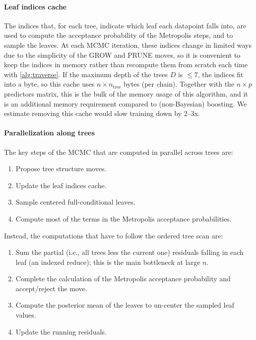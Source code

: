 \documentclass{article}
\begin{document}
\paragraph{Leaf indices cache}

The indices that, for each tree, indicate which leaf each datapoint falls
into, are used to compute the acceptance probability of the Metropolis steps,
and to sample the leaves. At each MCMC iteration, these indices change in
limited ways due to the simplicity of the GROW and PRUNE moves, so it is
convenient to keep the indices in memory rather than recompute them from scratch
each time with \autoref{alg:traverse}. If the maximum depth of the trees $D$ is
$\le 7$, the indices fit into a byte, so this cache uses $n \times
	n_\text{tree}$ bytes (per chain). Together with the $n\times p$ predictors matrix, this is
the bulk of the memory usage of this algorithm, and it is an
additional memory requirement compared to (non-Bayesian) boosting. We estimate
removing this cache would slow training down by 2--3x.

\paragraph{Parallelization along trees}

The key steps of the MCMC that are computed in parallel across trees are:
%
\begin{enumerate}
	\item Propose tree structure moves.
	\item Update the leaf indices cache.
	\item Sample centered full-conditional leaves.
	\item Compute most of the terms in the Metropolis acceptance probabilities.
\end{enumerate}

Instead, the computations that have to follow the ordered tree scan are:
%
\begin{enumerate}[start=5]
	\item Sum the partial (i.e., all trees less the current one) residuals
	      falling in each leaf (an indexed reduce); this is the main bottleneck at large $n$.
	\item Complete the calculation of the Metropolis acceptance probability and
	      accept/reject the move.
	\item Compute the posterior mean of the leaves to un-center the sampled leaf values.
	\item Update the running residuals.
\end{enumerate}
\end{document}

